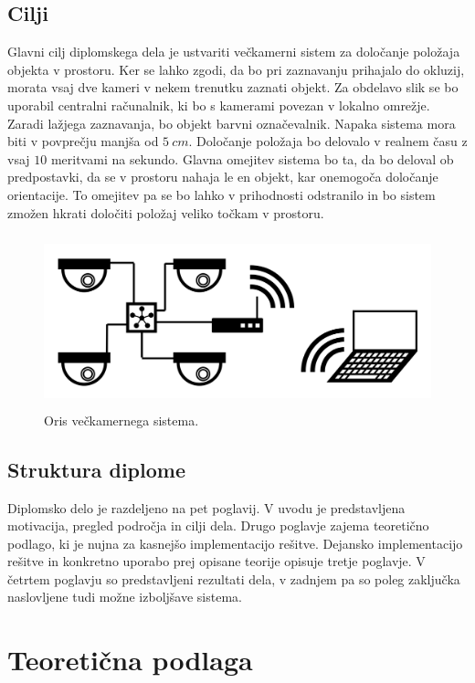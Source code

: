 \documentclass[a4paper, 12pt]{book}
\begin{document}
\section{Cilji}
Glavni cilj diplomskega dela je ustvariti večkamerni sistem za določanje položaja objekta v prostoru. Ker se lahko zgodi, da bo pri zaznavanju prihajalo do okluzij, morata vsaj dve kameri v nekem trenutku zaznati objekt. Za obdelavo slik se bo uporabil centralni računalnik, ki bo s kamerami povezan v lokalno omrežje. Zaradi lažjega zaznavanja, bo objekt barvni označevalnik. Napaka sistema mora biti v povprečju manjša od $5 \ cm$. Določanje položaja bo delovalo v realnem času z vsaj $10$ meritvami na sekundo. Glavna omejitev sistema bo ta, da bo deloval ob predpostavki, da se v prostoru nahaja le en objekt, kar onemogoča določanje orientacije. To omejitev pa se bo lahko v prihodnosti odstranilo in bo sistem zmožen hkrati določiti položaj veliko točkam v prostoru.

\begin{figure}[H]
\centering
\includegraphics[height=5cm]{topology.png}
\caption{Oris večkamernega sistema.}
\label{topologyimg}
\end{figure}

\section{Struktura diplome}
Diplomsko delo je razdeljeno na pet poglavij. V uvodu je predstavljena motivacija, pregled področja in cilji dela. Drugo poglavje zajema teoretično podlago, ki je nujna za kasnejšo implementacijo rešitve. Dejansko implementacijo rešitve in konkretno uporabo prej opisane teorije opisuje tretje poglavje. V četrtem poglavju so predstavljeni rezultati dela, v zadnjem pa so poleg zaključka naslovljene tudi možne izboljšave sistema.

\chapter{Teoretična podlaga}
\end{document}
